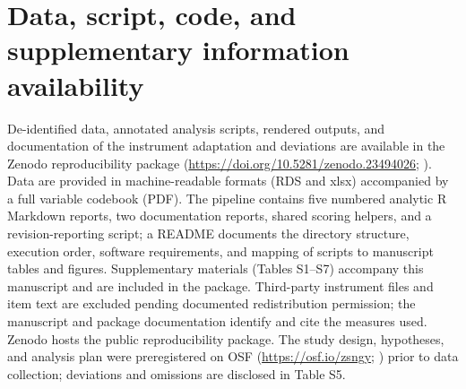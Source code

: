 \documentclass[PCJ,Unicode,screen,mode=plain]{cedram}
\begin{document}
\section*{Data, script, code, and supplementary information availability}\label{data-availability-statement}

De-identified data, annotated analysis scripts, rendered outputs, and
documentation of the instrument adaptation and deviations are available in the
Zenodo reproducibility package
(\url{https://doi.org/10.5281/zenodo.23494026}; \citealp{Kaleta2026Package}). Data are
provided in machine-readable formats (RDS and xlsx) accompanied by a full
variable codebook (PDF). The pipeline contains five numbered analytic R
Markdown reports, two documentation reports, shared scoring helpers, and a
revision-reporting script; a README documents the directory structure,
execution order, software requirements, and mapping of scripts to manuscript
tables and figures. Supplementary materials (Tables S1--S7) accompany this
manuscript and are included in the package. Third-party instrument files and
item text are excluded pending documented redistribution permission; the
manuscript and package documentation identify and cite the measures used.
Zenodo hosts the public reproducibility package. The study design, hypotheses,
and analysis plan were
preregistered on OSF (\url{https://osf.io/zsngy}; \citealp{Kaleta2025Prereg}) prior to data collection;
deviations and omissions are disclosed in Table S5.

\printbibliography
\end{document}
